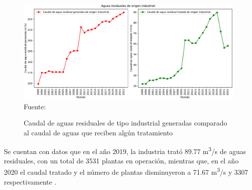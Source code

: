 \begin{figure}[H]
	\centering
	\includegraphics[scale=0.45]{../Images/AR_industrial.pdf}
	\\\small{Fuente: \cite{ODS23}}
	\caption{Caudal de aguas residuales de tipo industrial generadas comparado al caudal de aguas que reciben algún tratamiento}\label{aguaind}
\end{figure}
Se cuentan con datos que en el año 2019, la industria trató 89.77 m\textsuperscript{3}/s de aguas residuales, con un total de 3531 plantas en operación, mientras que, en el año 2020 el caudal tratado y el número de plantas disminuyeron a 71.67 m\textsuperscript{3}/s y 3307 respectivamente \citep{EAM}.\par

